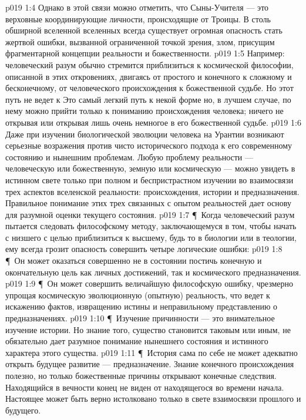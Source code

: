 \vs p019 1:4 Однако в этой связи можно отметить, что Сыны\hyp{}Учителя --- это верховные координирующие личности, происходящие от Троицы. В столь обширной вселенной вселенных всегда существует огромная опасность стать жертвой ошибки, вызванной ограниченной точкой зрения, злом, присущим фрагментарной концепции реальности и божественности.
\vs p019 1:5 Например: человеческий разум обычно стремится приблизиться к космической философии, описанной в этих откровениях, двигаясь от простого и конечного к сложному и бесконечному, от человеческого происхождения к божественной судьбе. Но этот путь не ведет к  Это самый легкий путь к некой форме  но, в лучшем случае, по нему можно прийти только к пониманию происхождения человека; ничего не открывая или открывая лишь очень немногое в его божественной судьбе.
\vs p019 1:6 Даже при изучении биологической эволюции человека на Урантии возникают серьезные возражения против чисто исторического подхода к его современному состоянию и нынешним проблемам. Любую проблему реальности --- человеческую или божественную, земную или космическую --- можно увидеть в истинном свете только при полном и беспристрастном изучении во взаимосвязи трех аспектов вселенской реальности: происхождения, истории и предназначения. Правильное понимание этих трех связанных с опытом реальностей дает основу для разумной оценки текущего состояния.
\vs p019 1:7 \P\ Когда человеческий разум пытается следовать философскому методу, заключающемуся в том, чтобы начать с низшего с целью приблизиться к высшему, будь то в биологии или в теологии, ему всегда грозит опасность совершить четыре логические ошибки:
\vs p019 1:8 \P\ \bibnobreakspace Он может оказаться совершенно не в состоянии постичь конечную и окончательную цель как личных достижений, так и космического предназначения.
\vs p019 1:9 \P\ \bibnobreakspace Он может совершить величайшую философскую ошибку, чрезмерно упрощая космическую эволюционную (опытную) реальность, что ведет к искажению фактов, извращению истины и неправильному представлению о предназначениях.
\vs p019 1:10 \P\ \bibnobreakspace Изучение причинности --- это внимательное изучение истории. Но знание того,  существо становится таковым или иным, не обязательно дает разумное понимание нынешнего состояния и истинного характера этого существа.
\vs p019 1:11 \P\ \bibnobreakspace История сама по себе не может адекватно открыть будущее развитие --- предназначение. Знание конечного происхождения полезно, но только божественные причины открывают конечные следствия. Находящийся в вечности конец не виден от находящегося во времени начала. Настоящее может быть верно истолковано только в свете взаимосвязи прошлого и будущего.
